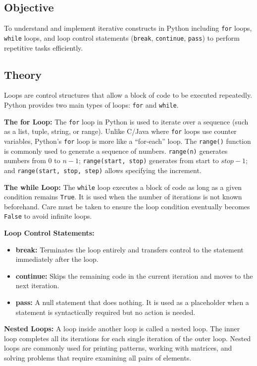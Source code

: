\documentclass[12pt,a4paper]{article}
\begin{document}
\subsection{Objective}
To understand and implement iterative constructs in Python including \texttt{for} loops, \texttt{while} loops, and loop control statements (\texttt{break}, \texttt{continue}, \texttt{pass}) to perform repetitive tasks efficiently.

\subsection{Theory}

Loops are control structures that allow a block of code to be executed repeatedly. Python provides two main types of loops: \texttt{for} and \texttt{while}.

\textbf{The for Loop:}
The \texttt{for} loop in Python is used to iterate over a sequence (such as a list, tuple, string, or range). Unlike C/Java where \texttt{for} loops use counter variables, Python's \texttt{for} loop is more like a ``for-each'' loop. The \texttt{range()} function is commonly used to generate a sequence of numbers. \texttt{range(n)} generates numbers from 0 to $n-1$; \texttt{range(start, stop)} generates from start to $stop-1$; and \texttt{range(start, stop, step)} allows specifying the increment.

\textbf{The while Loop:}
The \texttt{while} loop executes a block of code as long as a given condition remains \texttt{True}. It is used when the number of iterations is not known beforehand. Care must be taken to ensure the loop condition eventually becomes \texttt{False} to avoid infinite loops.

\textbf{Loop Control Statements:}
\begin{itemize}
  \item \textbf{break:} Terminates the loop entirely and transfers control to the statement immediately after the loop.
  \item \textbf{continue:} Skips the remaining code in the current iteration and moves to the next iteration.
  \item \textbf{pass:} A null statement that does nothing. It is used as a placeholder when a statement is syntactically required but no action is needed.
\end{itemize}

\textbf{Nested Loops:}
A loop inside another loop is called a nested loop. The inner loop completes all its iterations for each single iteration of the outer loop. Nested loops are commonly used for printing patterns, working with matrices, and solving problems that require examining all pairs of elements.
\end{document}
